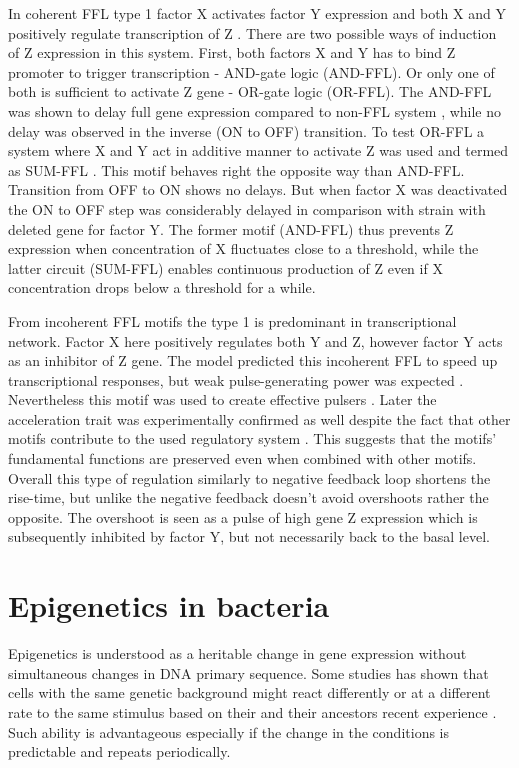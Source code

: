 In coherent FFL type 1 factor X activates factor Y expression and both X and Y positively regulate transcription of Z \cite{mangan2003structure}.
There are two possible ways of induction of Z expression in this system.
First, both factors X and Y has to bind Z promoter to trigger transcription - AND-gate logic (AND-FFL).
Or only one of both is sufficient to activate Z gene - OR-gate logic (OR-FFL).
The AND-FFL was shown to delay full gene expression compared to non-FFL system \cite{mangan2003coherent}, while no delay was observed in the inverse (ON to OFF) transition.
To test OR-FFL a system where X and Y act in additive manner to activate Z was used and termed as SUM-FFL \cite{kalir2005coherent}.
This motif behaves right the opposite way than AND-FFL.
Transition from OFF to ON shows no delays.
But when factor X was deactivated the ON to OFF step was considerably delayed in comparison with strain with deleted gene for factor Y.
The former motif (AND-FFL) thus prevents Z expression when concentration of X fluctuates close to a threshold, while the latter circuit (SUM-FFL) enables continuous production of Z even if X concentration drops below a threshold for a while.

From incoherent FFL motifs the type 1 is predominant in  transcriptional network.
Factor X here positively regulates both Y and Z, however factor Y acts as an inhibitor of Z gene.
The model predicted this incoherent FFL to speed up transcriptional responses, but weak pulse-generating power was expected \cite{mangan2003structure}.
Nevertheless this motif was used to create effective pulsers \cite{basu2004spatiotemporal}.
Later the acceleration trait was experimentally confirmed as well despite the fact that other motifs contribute to the used regulatory system \cite{mangan2006incoherent}.
This suggests that the motifs' fundamental functions are preserved even when combined with other motifs.
Overall this type of regulation similarly to negative feedback loop shortens the rise-time, but unlike the negative feedback doesn't avoid overshoots rather the opposite.
The overshoot is seen as a pulse of high gene Z expression which is subsequently inhibited by factor Y, but not necessarily back to the basal level.


\section{Epigenetics in bacteria}
Epigenetics is understood as a heritable change in gene expression without simultaneous changes in DNA primary sequence.
Some studies has shown that cells with the same genetic background might react differently or at a different rate to the same stimulus based on their and their ancestors recent experience \cite{mathis2017asymmetric, ronin2017long}.
Such ability is advantageous especially if the change in the conditions is predictable and repeats periodically.

